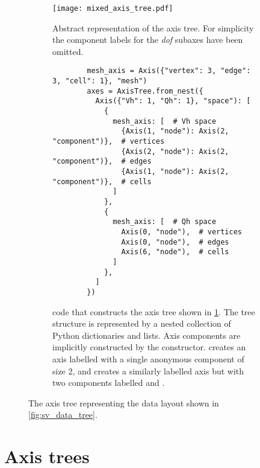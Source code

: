 \documentclass[thesis]{subfiles}
\begin{document}
\begin{figure}
  \centering
  \begin{subfigure}{\textwidth}
    \centering
    \texttt{[image: mixed\_axis\_tree.pdf]}
    \caption{
      Abstract representation of the axis tree.
      For simplicity the component labels for the \textit{dof} subaxes have been omitted.
    }
    \label{fig:axis_tree_abstract}
  \end{subfigure}

  \vspace{1em}

  \begin{subfigure}{\textwidth}
    \centering
    \begin{minipage}{.8\textwidth}
      \begin{verbatim}
        mesh_axis = Axis({"vertex": 3, "edge": 3, "cell": 1}, "mesh")
        axes = AxisTree.from_nest({
          Axis({"Vh": 1, "Qh": 1}, "space"): [
            {
              mesh_axis: [  # Vh space
                {Axis(1, "node"): Axis(2, "component")},  # vertices
                {Axis(2, "node"): Axis(2, "component")},  # edges
                {Axis(1, "node"): Axis(2, "component")},  # cells
              ]
            },
            {
              mesh_axis: [  # Qh space
                Axis(0, "node"),  # vertices
                Axis(0, "node"),  # edges
                Axis(6, "node"),  # cells
              ]
            },
          ]
        })
      \end{verbatim}
    \end{minipage}
    \caption{
       code that constructs the axis tree shown in \cref{fig:axis_tree_abstract}.
      The tree structure is represented by a nested collection of Python dictionaries and lists.
      Axis components are implicitly constructed by the  constructor.
       creates an axis labelled  with a single anonymous component of size 2, and  creates a similarly labelled axis but with two components labelled  and .
    }
    \label{fig:axis_tree_code}
  \end{subfigure}
  \caption{
    The axis tree representing the data layout shown in \cref{fig:sv_data_tree}.
  }
  \label{fig:axis_tree}
\end{figure}

\section{Axis trees}
\label{sec:axis_trees}
\end{document}
